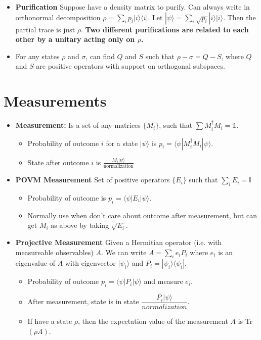 \documentclass[12pt]{article}
\begin{document}
\begin{itemize}
\begin{proof}
$u$ and $v$ just perform a change of basis.
The {\bf{Schmidt Order}} is the number of terms in the sum. More than 1 means entangled.
\end{proof}
\item {\bf{Purification}}
Suppose have a density matrix to purify. Can always write in orthonormal decomposition $\rho=\sum_ip_i|i\rangle\langle i|$. Let $|\psi\rangle=\sum_i\sqrt{p_i}|i\rangle|i\rangle$. Then the partial trace 
is just $\rho$. {\bf{Two different purifications are related to each other by a unitary acting only on $\rho$.}}
\item For any states $\rho$ and $\sigma$, can find $Q$ and $S$ such that  $\rho-\sigma=Q-S$, where $Q$ and $S$ are positive operators 
with support on orthogonal subspaces.
\end{itemize}

\section{Measurements}
\begin{itemize}
\item {\bf{Measurement:}} Is a set of any matrices $\{M_i\}$, such that $\sum M^\dagger_iM_i=\mathbb{1}$.
\begin{itemize}
\item Probability of outcome $i$ for a state $|\psi\rangle$ is $p_i=\langle\psi|M_i^\dagger M_i|\psi\rangle$.
\item State after outcome $i$ is $\frac{M_i|\psi\rangle}{\text{normalization}}$
\end{itemize}
\item {\bf{POVM Measurement}} Set of positive operators $\{E_i\}$ such that $\sum_iE_i=\mathbb{I}$
\begin{itemize}
\item Probability of outcome is $p_i=\langle\psi|E_i|\psi\rangle$.
\item Normally use when don't care about outcome after measurement, but can get $M_i$ as above by taking $\sqrt{E_i}$.
\end{itemize}
\item {\bf{Projective Measurement}} Given a Hermitian operator (i.e. with measureable observables) $A$. We can write $A=\sum_i e_iP_i$ where $e_i$ is an eigenvalue of $A$ with eigenvector $|\psi_i\rangle$ and $P_i=|\psi_i\rangle\langle\psi_i|$.
\begin{itemize}
\item Probability of outcome $p_i=\langle\psi|P_i|\psi\rangle$ and measure $e_i$.
\item After measurement, state is in state $\dfrac{P_i|\psi\rangle}{normalization}$.
\item If have a state $\rho$, then the expectation value of the measurement $A$ is Tr$(\rho A)$. 
\end{itemize}
\end{itemize}
\end{document}
